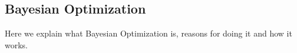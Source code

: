 \subsection{Bayesian Optimization}
Here we explain what Bayesian Optimization is, reasons for doing it and how it works.